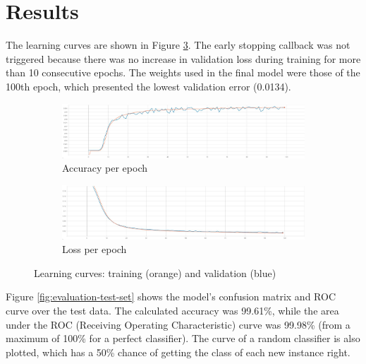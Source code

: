 \documentclass[a4paper,fleqn]{cas-sc}
\begin{document}
	\section{Results}\label{sec:results}
	
	The learning curves are shown in Figure \ref{fig:learning-curves}. The early stopping callback was not triggered because there was no increase in validation loss during training for more than 10 consecutive epochs. The weights used in the final model were those of the 100th epoch, which presented the lowest validation error (0.0134).
	
	\begin{figure}[h]
		\centering
		\begin{subfigure}[b]{0.8\linewidth}
			\includegraphics[width=1\linewidth]{figures/accuracy-big.jpg}
			\caption{Accuracy per epoch}
			\label{fig:accuracy}
		\end{subfigure}
		\begin{subfigure}[b]{0.8\linewidth}
			\includegraphics[width=\linewidth]{figures/loss-big.jpg}
			\caption{Loss per epoch}
			\label{fig:loss}
		\end{subfigure}
		\caption{Learning curves: training (orange) and validation (blue)}
		\label{fig:learning-curves}
	\end{figure}
	
	Figure \ref{fig:evaluation-test-set} shows the model's confusion matrix and ROC curve over the test data. The calculated accuracy was 99.61\%, while the area under the ROC (Receiving Operating Characteristic) curve was 99.98\% (from a maximum of 100\% for a perfect classifier). The curve of a random classifier is also plotted, which has a 50\% chance of getting the class of each new instance right.
	
\end{document}
